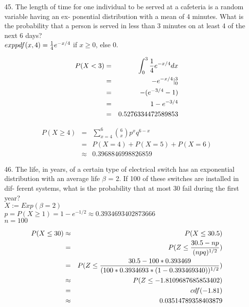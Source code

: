 45. The length of time for one individual to be
served at a cafeteria is a random variable having an ex-
ponential distribution with a mean of 4 minutes. What
is the probability that a person is served in less than 3
minutes on at least 4 of the next 6 days? \\

$exppdf(x,4) = \frac{1}{4} e^{-x/4}$ if $x \geq 0$, else $0$.

\begin{eqnarray*}
P(X < 3) & = & \int_0^3 \frac{1}{4} e^{-x/4} dx \\
  & = & -e^{-x/4} |^3_0 \\
  & = & -(e^{-3/4} - 1) \\
  & = & 1 - e^{-3/4} \\
  & = & 0.5276334472589853
\end{eqnarray*}

\begin{eqnarray*}
P(X \geq 4) & = & \sum^6_{x=4} {6 \choose x}  p^x q^{6-x} \\
& = & P(X = 4) + P(X = 5) + P(X = 6) \\
& \approx & 0.3968846998826859 
\end{eqnarray*}

46. The life, in years, of a certain type of electrical
switch has an exponential distribution with an average
life $\beta$ = 2. If 100 of these switches are installed in dif-
ferent systems, what is the probability that at most 30
fail during the first year? \\

$X := Exp(\beta = 2)$  \\

$p = $$P(X \geq 1) = 1 - e^{-1/2} \approx 0.3934693402873666$ \\

$n = 100$


\begin{eqnarray*}
P(X \leq 30) & \approx & P(X \leq 30.5) \\
             & = & P(Z \leq \frac{30.5 - np}{(npq)^{1/2}}) \\
             & = & P(Z \leq \frac{30.5 - 100* 0.393469}{(100 * 0.3934693 * (1- 0.393469340))^{1/2}}) \\
& \approx & P(Z \leq -1.8109687685853402) \\
& = & cdf(-1.81) \\
& \approx & 0.03514789358403879
\end{eqnarray*}


